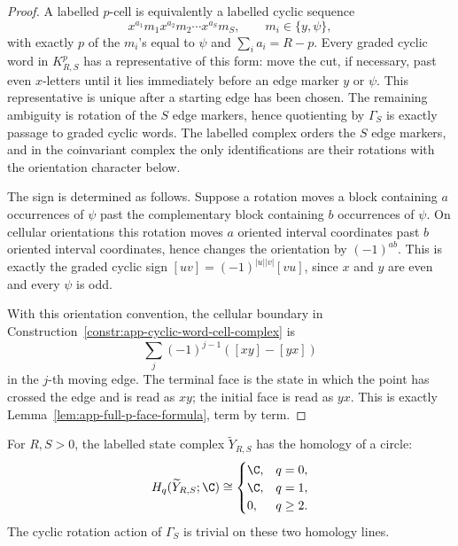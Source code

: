 \begin{proof}
  A labelled \(p\)-cell is equivalently a labelled cyclic sequence
  \[
    x^{a_1}m_1x^{a_2}m_2\cdots x^{a_S}m_S,\qquad
    m_i\in\{y,\psi\},
  \]
  with exactly \(p\) of the \(m_i\)'s equal to \(\psi\) and
  \(\sum_i a_i=R-p\).  Every graded cyclic word in
  \(K^p_{R,S}\) has a representative of this form: move the cut, if
  necessary, past even \(x\)-letters until it lies immediately before an edge
  marker \(y\) or \(\psi\).  This representative is unique after a starting
  edge has been chosen.  The remaining ambiguity is rotation of the \(S\) edge
  markers, hence quotienting by \(\Gamma_S\) is exactly passage to graded
  cyclic words.  The labelled complex orders the \(S\) edge markers, and
  in the coinvariant complex the only
  identifications are their rotations with the orientation character below.

  The sign is determined as follows.  Suppose a rotation moves a block containing
  \(a\) occurrences of
  \(\psi\) past the complementary block containing \(b\) occurrences of
  \(\psi\).  On cellular orientations this rotation moves \(a\) oriented
  interval coordinates past \(b\) oriented interval coordinates, hence changes
  the orientation by \((-1)^{ab}\).  This is exactly the graded cyclic sign
  \([uv]=(-1)^{|u||v|}[vu]\), since \(x\) and \(y\) are even and every
  \(\psi\) is odd.

  With this orientation convention, the cellular boundary in
  Construction~\ref{constr:app-cyclic-word-cell-complex} is
  \[
    \sum_j(-1)^{j-1}([xy]-[yx])
  \]
  in the \(j\)-th moving edge.  The terminal face is the state in which the
  point has crossed the edge and is read as \(xy\); the initial face is read as
  \(yx\).  This is exactly Lemma~\ref{lem:app-full-p-face-formula}, term by
  term.
\end{proof}

\begin{lem}
\label{lem:app-abel-map-state-homology}
  For \(R,S>0\), the labelled state complex \(\widetilde Y_{R,S}\) has the
  homology of a circle:
  \[
    H_q(\widetilde Y_{R,S};\C)\cong
    \begin{cases}
      \C,&q=0,\\
      \C,&q=1,\\
      0,&q\geq2.
    \end{cases}
  \]
  The cyclic rotation action of \(\Gamma_S\) is trivial on these two homology
  lines.
\end{lem}

